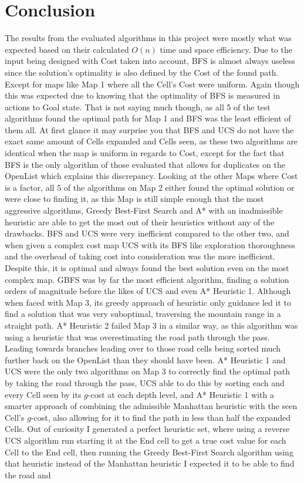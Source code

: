 \documentclass[conference]{IEEEtran}
\begin{document}

\section*{Conclusion}

The results from the evaluated algorithms in this project were mostly what was expected based on their calculated $O(n)$ time and space efficiency. Due to the input being designed with Cost taken into account, BFS is almost always useless since the solution's optimality is also defined by the Cost of the found path. Except for maps like Map 1 where all the Cell's Cost were uniform. Again though this was expected due to knowing that the optimality of BFS is measured in actions to Goal state. That is not saying much though, as all 5 of the test algorithms found the optimal path for Map 1 and BFS was the least efficient of them all. At first glance it may surprise you that BFS and UCS do not have the exact same amount of Cells expanded and Cells seen, as these two algorithms are identical when the map is uniform in regards to Cost, except for the fact that BFS is the only algorithm of those evaluated that allows for duplicates on the OpenList which explains this discrepancy. Looking at the other Maps where Cost is a factor, all 5 of the algorithms on Map 2 either found the optimal solution or were close to finding it, as this Map is still simple enough that the most aggressive algorithms, Greedy Best-First Search and A* with an inadmissible heuristic are able to get the most out of their heuristics without any of the drawbacks. BFS and UCS were very inefficient compared to the other two, and when given a complex cost map UCS with its BFS like exploration thoroughness and the overhead of taking cost into consideration was the more inefficient. Despite this, it is optimal and always found the best solution even on the most complex map. GBFS was by far the most efficient algorithm, finding a solution orders of magnitude before the likes of UCS and even A* Heuristic 1. Although when faced with Map 3, its greedy approach of heuristic only guidance led it to find a solution that was very suboptimal, traversing the mountain range in a straight path. A* Heuristic 2 failed Map 3 in a similar way, as this algorithm was using a heuristic that was overestimating the road path through the pass. Leading towards branches leading over to those road cells being sorted much further back on the OpenList than they should have been. A* Heuristic 1 and UCS were the only two algorithms on Map 3 to correctly find the optimal path by taking the road through the pass, UCS able to do this by sorting each and every Cell seen by its $g$-cost at each depth level, and A* Heuristic 1 with a smarter approach of combining the admissible Manhattan heuristic with the seen Cell's $g$-cost, also allowing for it to find the path in less than half the expanded Cells. Out of curiosity I generated a perfect heuristic set, where using a reverse UCS algorithm run starting it at the End cell to get a true cost value for each Cell to the End cell, then running the Greedy Best-First Search algorithm using that heuristic instead of the Manhattan heuristic I expected it to be able to find the road and 
\end{document}
